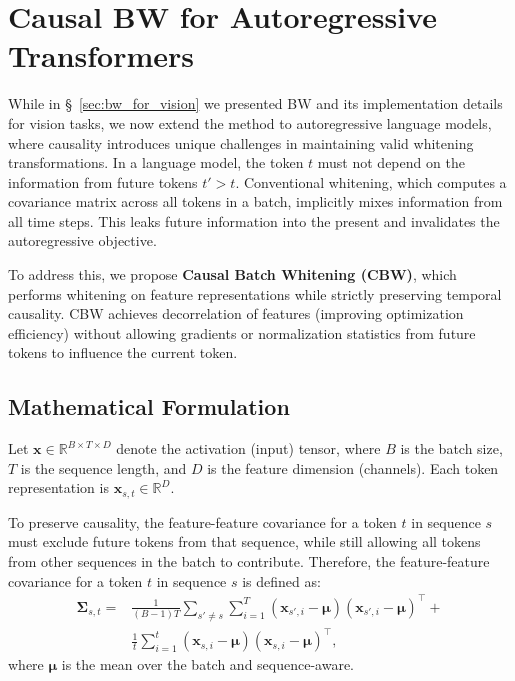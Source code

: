 \section{Causal BW for Autoregressive Transformers}

While in \S~\ref{sec:bw_for_vision} we presented BW and its implementation details for vision tasks, we now extend the method to autoregressive language models, where causality introduces unique challenges in maintaining valid whitening transformations.
In a language model, the token $t$ must not depend on the information from future tokens $t' > t$.  
Conventional whitening, which computes a covariance matrix across all tokens in a batch, implicitly mixes information from all time steps.
This leaks future information into the present and invalidates the autoregressive objective.

To address this, we propose \textbf{Causal Batch Whitening (CBW)}, which performs whitening on feature representations while strictly preserving temporal causality.  
CBW achieves decorrelation of features (improving optimization efficiency) without allowing gradients or normalization statistics from future tokens to influence the current token.


\subsection{Mathematical Formulation}


Let $\mathbf{x} \in \mathbb{R}^{B \times T \times D}$ denote the activation (input) tensor, where $B$ is the batch size, $T$ is the sequence length, and $D$ is the feature dimension (channels).  
Each token representation is $\mathbf{x}_{s,t} \in \mathbb{R}^{D}$.

To preserve causality, the feature-feature covariance for a token $t$ in sequence $s$ must exclude future tokens from that sequence, while still allowing all tokens from other sequences in the batch to contribute.
Therefore, the feature-feature covariance for a token $t$ in sequence $s$ is defined as:
\begin{align} \label{eq:full_cbw}
\boldsymbol{\Sigma}_{s,t} =& \frac{1}{(B-1) T}
\sum_{s' \neq s} \sum_{i=1}^{T} (\mathbf{x}_{s',i} - \boldsymbol{\mu}) (\mathbf{x}_{s',i} - \boldsymbol{\mu})^\top
+ \nonumber \\
& \frac{1}{t} \sum_{i=1}^{t} (\mathbf{x}_{s,i} - \boldsymbol{\mu}) (\mathbf{x}_{s,i} - \boldsymbol{\mu})^\top,
\end{align}
where $\boldsymbol{\mu}$ is the mean over the batch and sequence-aware.  

